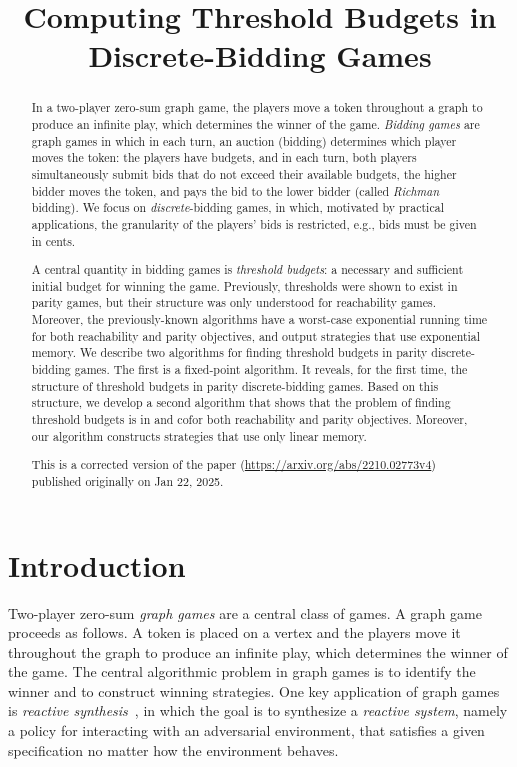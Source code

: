 \documentclass{theoretics}
\title{Computing Threshold Budgets in Discrete-Bidding Games}
\begin{document}
\maketitle

\begin{abstract}
In a two-player zero-sum graph game, the players move a token throughout a graph to produce an infinite play, which determines the winner of the game. \emph{Bidding games} are graph games in which in each turn, an auction (bidding) determines which player moves the token: the players have budgets, and in each turn, both players simultaneously submit bids that do not exceed their available budgets, the higher bidder moves the token, and pays the bid to the lower bidder (called {\em Richman} bidding). We focus on {\em discrete}-bidding games, in which, motivated by practical applications, the granularity of the players' bids is restricted, e.g., bids must be given in cents. 

A central quantity in bidding games is {\em threshold budgets}:  a necessary and sufficient initial budget for winning the game. Previously, thresholds were shown to exist in parity games, but their structure was only understood for reachability games. Moreover, the previously-known algorithms have a worst-case exponential running time for both reachability and parity objectives, and output strategies that use exponential memory. 
We describe two algorithms for finding threshold budgets in parity discrete-bidding games. The first is a fixed-point algorithm. 
It reveals, for the first time, the structure of threshold budgets in parity discrete-bidding games. 
Based on this structure, we develop a second algorithm that shows that the problem of finding threshold budgets is in \NP and co\NP for both reachability and parity objectives. Moreover, our algorithm constructs strategies that use only linear memory.

This is a corrected version of the paper (\url{https://arxiv.org/abs/2210.02773v4}) published originally on Jan 22, 2025.
\end{abstract}

%
\section{Introduction}
Two-player zero-sum {\em graph games} are a central class of games. A graph game proceeds as follows. A token is placed on a vertex and the players move it throughout the graph to produce an infinite play, which determines the winner of the game. The central algorithmic problem in graph games is to identify the winner and to construct winning strategies. One key application of graph games is {\em reactive synthesis}~\cite{PR89}, in which the goal is to synthesize a {\em reactive system}, namely a policy for interacting with an adversarial environment,  that satisfies a given specification no matter how the environment behaves. %
\end{document}

